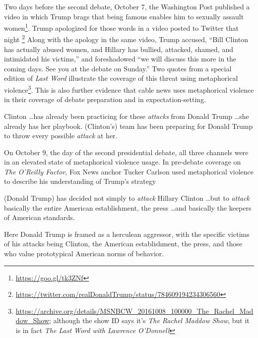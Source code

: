 Two days before the second debate, October 7, the Washington Post published a video
in which Trump brags that being famous enables him to 
sexually assault women\footnote{\url{https://goo.gl/tk3ZNf}}. 
Trump apologized for those words in a video posted to Twitter that night
\footnote{\url{https://twitter.com/realDonaldTrump/status/784609194234306560}} 
Along with the apology in the same video, Trump accused, ``Bill Clinton has actually
abused women, and Hillary has bullied, attacked, shamed, and 
intimidated his victims,'' and
foreshadowed ``we will discuss this more in the coming days. See you at the
debate on Sunday.'' 
Two quotes from a special edition of \emph{Last Word} illustrate the coverage
of this threat using metaphorical violence\footnote{\url{https://archive.org/details/MSNBCW_20161008_100000_The_Rachel_Maddow_Show}; although the show
ID says it's \emph{The Rachel Maddow Show}, but it is in fact 
\emph{The Last Word with Lawrence O'Donnell}}. This is also further evidence that
cable news uses metaphorical violence in their coverage of debate preparation
and in expectation-setting.  

\begin{exe}
  \ex Clinton \ldots has already been practicing for these \emph{attacks} from 
    Donald Trump \ldots she already has her playbook.
  \ex (Clinton's) team has been preparing for Donald Trump to throw every 
    possible \emph{attack} at her.
\end{exe}



On October 9, the day of the second presidential debate, 
all three channels were in an elevated state of 
metaphorical violence usage. In pre-debate coverage on \emph{The O'Reilly Factor},
Fox News anchor Tucker Carlson used metaphorical violence to 
describe his understanding of Trump's strategy
\begin{exe}
  \ex (Donald Trump) has decided not simply to \emph{attack} Hillary Clinton \ldots but to 
  \emph{attack} basically the entire American establishment, the press \ldots and
  basically the keepers of American standards.
\end{exe}
Here Donald Trump is framed as a herculean aggressor,
with the specific victims of his attacks being Clinton, the American establishment,
the press, and those who value prototypical American norms of behavior. 


